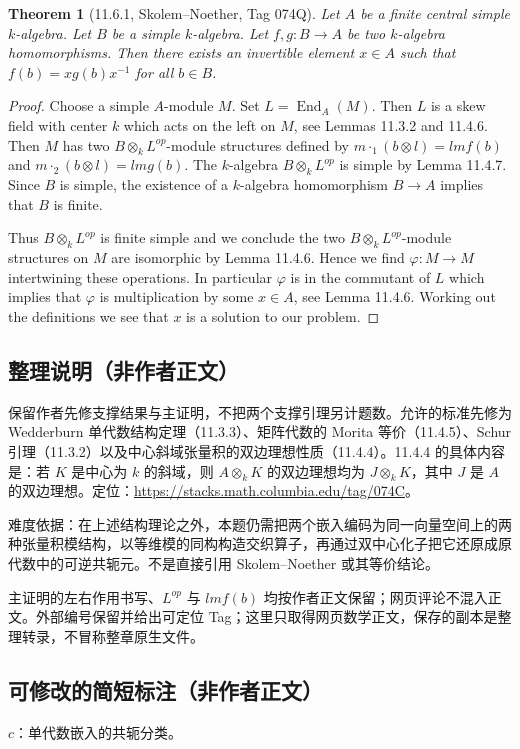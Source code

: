 \documentclass[UTF8,11pt]{ctexart}
\newtheorem*{theorem}{Theorem}
\theoremstyle{definition}
\begin{document}
\begin{theorem}[11.6.1, Skolem--Noether, Tag 074Q]
Let $A$ be a finite central simple $k$-algebra. Let $B$ be a simple $k$-algebra. Let $f,g:B\to A$ be two $k$-algebra homomorphisms. Then there exists an invertible element $x\in A$ such that $f(b)=xg(b)x^{-1}$ for all $b\in B$.
\end{theorem}
\begin{proof}
Choose a simple $A$-module $M$. Set $L=\operatorname{End}_A(M)$. Then $L$ is a skew field with center $k$ which acts on the left on $M$, see Lemmas 11.3.2 and 11.4.6. Then $M$ has two $B\otimes_k L^{op}$-module structures defined by $m\cdot_1(b\otimes l)=lmf(b)$ and $m\cdot_2(b\otimes l)=lmg(b)$. The $k$-algebra $B\otimes_k L^{op}$ is simple by Lemma 11.4.7. Since $B$ is simple, the existence of a $k$-algebra homomorphism $B\to A$ implies that $B$ is finite.

Thus $B\otimes_k L^{op}$ is finite simple and we conclude the two $B\otimes_k L^{op}$-module structures on $M$ are isomorphic by Lemma 11.4.6. Hence we find $\varphi:M\to M$ intertwining these operations. In particular $\varphi$ is in the commutant of $L$ which implies that $\varphi$ is multiplication by some $x\in A$, see Lemma 11.4.6. Working out the definitions we see that $x$ is a solution to our problem.
\end{proof}
\subsection*{整理说明（非作者正文）}
保留作者先修支撑结果与主证明，不把两个支撑引理另计题数。允许的标准先修为 Wedderburn 单代数结构定理（11.3.3）、矩阵代数的 Morita 等价（11.4.5）、Schur 引理（11.3.2）以及中心斜域张量积的双边理想性质（11.4.4）。11.4.4 的具体内容是：若 $K$ 是中心为 $k$ 的斜域，则 $A\otimes_kK$ 的双边理想均为 $J\otimes_kK$，其中 $J$ 是 $A$ 的双边理想。定位：\url{https://stacks.math.columbia.edu/tag/074C}。

难度依据：在上述结构理论之外，本题仍需把两个嵌入编码为同一向量空间上的两种张量积模结构，以等维模的同构构造交织算子，再通过双中心化子把它还原成原代数中的可逆共轭元。不是直接引用 Skolem--Noether 或其等价结论。

主证明的左右作用书写、$L^{op}$ 与 $lmf(b)$ 均按作者正文保留；网页评论不混入正文。外部编号保留并给出可定位 Tag；这里只取得网页数学正文，保存的副本是整理转录，不冒称整章原生文件。
\subsection*{可修改的简短标注（非作者正文）}
$c$：单代数嵌入的共轭分类。
\end{document}
